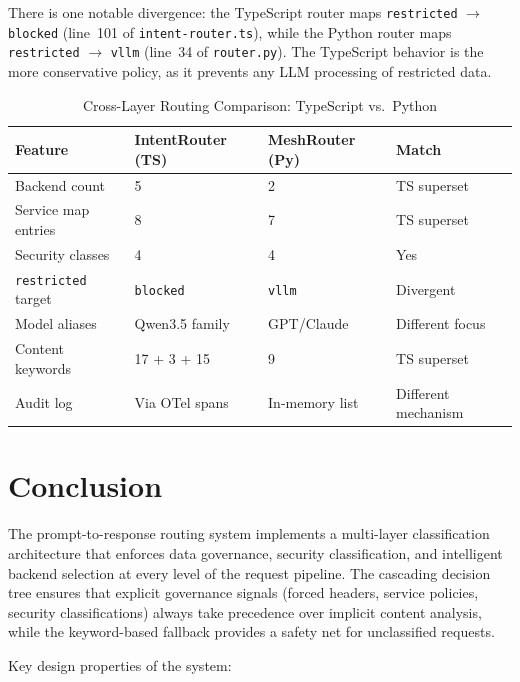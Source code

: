\documentclass[11pt]{article}
\begin{document}
There is one notable divergence: the TypeScript router maps
\texttt{restricted} $\rightarrow$ \texttt{blocked} (line~101 of
\texttt{intent-router.ts}), while the Python router maps
\texttt{restricted} $\rightarrow$ \texttt{vllm} (line~34 of
\texttt{router.py}). The TypeScript behavior is the more conservative policy,
as it prevents any LLM processing of restricted data.

\begin{table}[h]
\centering
\caption{Cross-Layer Routing Comparison: TypeScript vs.\ Python}
\begin{tabular}{@{}llll@{}}
\toprule
\textbf{Feature} & \textbf{IntentRouter (TS)} & \textbf{MeshRouter (Py)} & \textbf{Match} \\
\midrule
Backend count & 5 & 2 & TS superset \\
Service map entries & 8 & 7 & TS superset \\
Security classes & 4 & 4 & Yes \\
\texttt{restricted} target & \texttt{blocked} & \texttt{vllm} & Divergent \\
Model aliases & Qwen3.5 family & GPT/Claude & Different focus \\
Content keywords & 17 + 3 + 15 & 9 & TS superset \\
Audit log & Via OTel spans & In-memory list & Different mechanism \\
\bottomrule
\end{tabular}
\end{table}

\section{Conclusion}
\label{sec:conclusion}

The prompt-to-response routing system implements a multi-layer classification
architecture that enforces data governance, security classification, and
intelligent backend selection at every level of the request pipeline. The
cascading decision tree ensures that explicit governance signals (forced
headers, service policies, security classifications) always take precedence
over implicit content analysis, while the keyword-based fallback provides a
safety net for unclassified requests.

Key design properties of the system:
\end{document}
